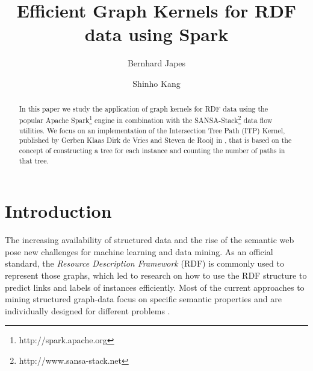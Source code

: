 \documentclass{easychair}
\begin{document}
\title{Efficient Graph Kernels for RDF data using Spark}


\author{
Bernhard Japes
\and
Shinho Kang
}



\clearpage

\maketitle

\begin{abstract}
In this paper we study the application of graph kernels for RDF data using the popular Apache Spark\footnote{http://spark.apache.org} engine in combination with the SANSA-Stack\footnote{http://www.sansa-stack.net} data flow utilities.
We focus on an implementation of the Intersection Tree Path (ITP) Kernel, published by Gerben Klaas Dirk de Vries and Steven de Rooij in \cite{FGK}, that is based on the concept of constructing a tree for each instance and counting the number of paths in that tree.
\end{abstract}

\setcounter{tocdepth}{2}
\pagestyle{empty}

\section{Introduction}
\label{sect:Introduction}
The increasing availability of structured data and the rise of the semantic web pose new challenges for machine learning and data mining. As an official standard, the \textit{Resource Description Framework} (RDF) is commonly used to represent those graphs, which led to research on how to use the RDF structure to predict links and labels of instances efficiently. Most of the current approaches to mining structured graph-data focus on specific semantic properties and are individually designed for different problems \cite{Rettinger2009, Huang2011}.
\end{document}
